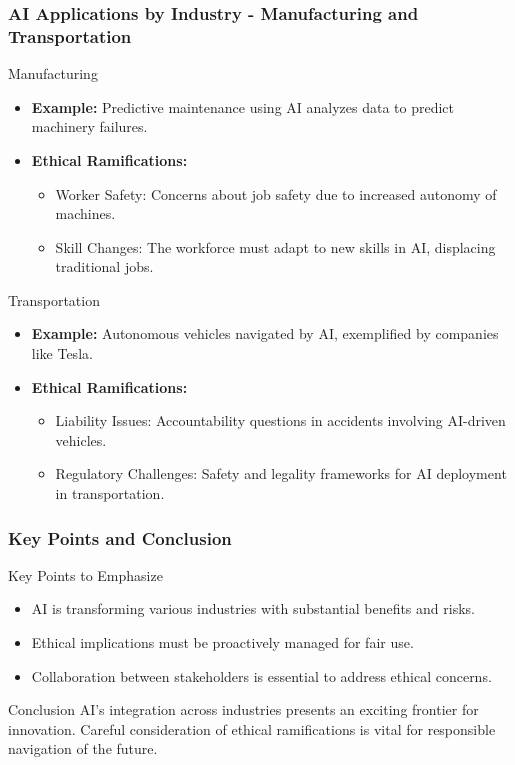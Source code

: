 \documentclass[aspectratio=169]{beamer}
\begin{document}
\begin{frame}[fragile]
    \frametitle{AI Applications by Industry - Manufacturing and Transportation}
    \begin{block}{Manufacturing}
        \begin{itemize}
            \item \textbf{Example:} Predictive maintenance using AI analyzes data to predict machinery failures.
            \item \textbf{Ethical Ramifications:}
            \begin{itemize}
                \item Worker Safety: Concerns about job safety due to increased autonomy of machines.
                \item Skill Changes: The workforce must adapt to new skills in AI, displacing traditional jobs.
            \end{itemize}
        \end{itemize}
    \end{block}
    
    \begin{block}{Transportation}
        \begin{itemize}
            \item \textbf{Example:} Autonomous vehicles navigated by AI, exemplified by companies like Tesla.
            \item \textbf{Ethical Ramifications:}
            \begin{itemize}
                \item Liability Issues: Accountability questions in accidents involving AI-driven vehicles.
                \item Regulatory Challenges: Safety and legality frameworks for AI deployment in transportation.
            \end{itemize}
        \end{itemize}
    \end{block}
\end{frame}

\begin{frame}[fragile]
    \frametitle{Key Points and Conclusion}
    \begin{block}{Key Points to Emphasize}
        \begin{itemize}
            \item AI is transforming various industries with substantial benefits and risks.
            \item Ethical implications must be proactively managed for fair use.
            \item Collaboration between stakeholders is essential to address ethical concerns.
        \end{itemize}
    \end{block}

    \begin{block}{Conclusion}
        AI's integration across industries presents an exciting frontier for innovation. Careful consideration of ethical ramifications is vital for responsible navigation of the future.
    \end{block}
\end{frame}
\end{document}
